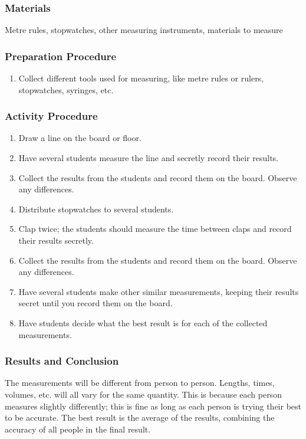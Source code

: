 \subsubsection*{Materials}
Metre rules, stopwatches, other measuring instruments, materials to measure

\subsubsection*{Preparation Procedure}
\begin{enumerate}
\item{Collect different tools used for measuring, like metre rules or rulers, stopwatches, syringes, etc.}
\end{enumerate}

\subsubsection*{Activity Procedure}
\begin{enumerate}
\item{Draw a line on the board or floor.}
\item{Have several students measure the line and secretly record their results.}
\item{Collect the results from the students and record them on the board. Observe any differences.}
\item{Distribute stopwatches to several students.}
\item{Clap twice; the students should measure the time between claps and record their results secretly.}
\item{Collect the results from the students and record them on the board. Observe any differences.}
\item{Have several students make other similar measurements, keeping their results secret until you record them on the board.}
\item{Have students decide what the best result is for each of the collected measurements.}
\end{enumerate}

\subsubsection*{Results and Conclusion}
The measurements will be different from person to person. Lengths, times, volumes, etc. will all vary for the same quantity. This is because each person measures slightly differently; this is fine as long as each person is trying their best to be accurate. The best result is the average of the results, combining the accuracy of all people in the final result.

